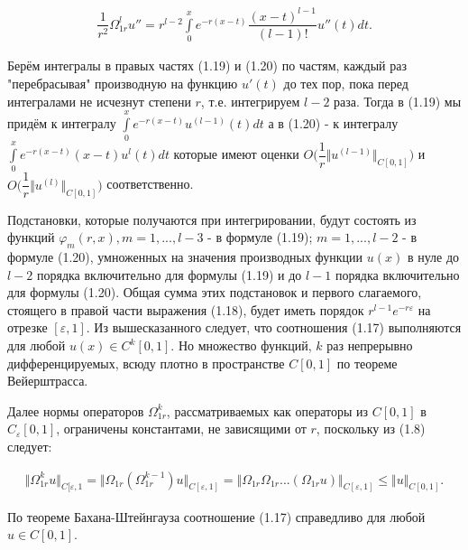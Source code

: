 \begin{equation}
\begin{array}{c}

\dfrac{1}{r^2} \Omega_{1r}^lu'' = r^{l-2}\int\limits_0^x e^{-r(x-t)}\dfrac{(x-t)^{l-1}}{(l-1)!}u''(t)dt.

\end{array}
\end{equation}

Берём интегралы в правых частях (1.19) и (1.20) по частям, каждый раз "перебрасывая" производную на функцию $ u'(t) $ до тех пор, пока перед интегралами не исчезнут степени $ r $, т.е. интегрируем $ l-2 $ раза. Тогда в (1.19) мы придём к интегралу $ \int\limits_0^x e^{-r(x-t)}u^{(l-1)}(t)dt $  а в (1.20) - к интегралу $ \int\limits_0^x e^{-r(x-t)}(x - t)u^l(t)dt $ которые имеют оценки $ O\biggl( \dfrac{1}{r}\Vert u^{(l - 1)} \Vert_{C[0,1]} \biggr) $ и $ O\biggl( \dfrac{1}{r}\Vert u^{(l)} \Vert_{C[0,1]} \biggr) $ соответственно.

Подстановки, которые получаются при интегрировании, будут состоять из функций $ \varphi_m(r,x), m = 1,...,l-3 $ - в формуле (1.19); $ m = 1,...,l-2 $ - в формуле (1.20), умноженных на значения производных функции $ u(x) $ в нуле до $ l-2 $ порядка включительно для формулы (1.19) и до $ l-1 $ порядка включительно для формулы (1.20). Общая сумма этих подстановок и первого слагаемого, стоящего в правой части выражения (1.18), будет иметь порядок $ r^{l-1}e^{-r\varepsilon} $ на отрезке $ [\varepsilon ,1] $.
Из вышесказанного следует, что соотношения (1.17) выполняются для любой $ u(x) \in C^k[0,1] $. Но множество функций, $ k $ раз непрерывно дифференцируемых, всюду плотно в пространстве $ C[0,1] $ по теореме Вейерштрасса.

Далее нормы операторов $ \Omega_{1r}^k $, рассматриваемых как операторы из $ C[0,1] $ в $ C_\varepsilon [0,1] $, ограничены константами, не зависящими от $ r $, поскольку из (1.8) следует:

\begin{equation}
\begin{array}{c}
\nonumber

\Vert \Omega_{1r}^ku \Vert_{C[\varepsilon ,1} = \Vert \Omega_{1r}(\Omega_{1r}^{k-1})u \Vert_{C[\varepsilon ,1]} = \Vert \Omega_{1r}\Omega_{1r}...(\Omega_{1r}u) \Vert_{C[\varepsilon ,1]} \leq \Vert u \Vert_{C[0,1]}.

\end{array}
\end{equation}


По теореме Бахана-Штейнгауза соотношение (1.17) справедливо для любой $ u \in C[0,1] $.

